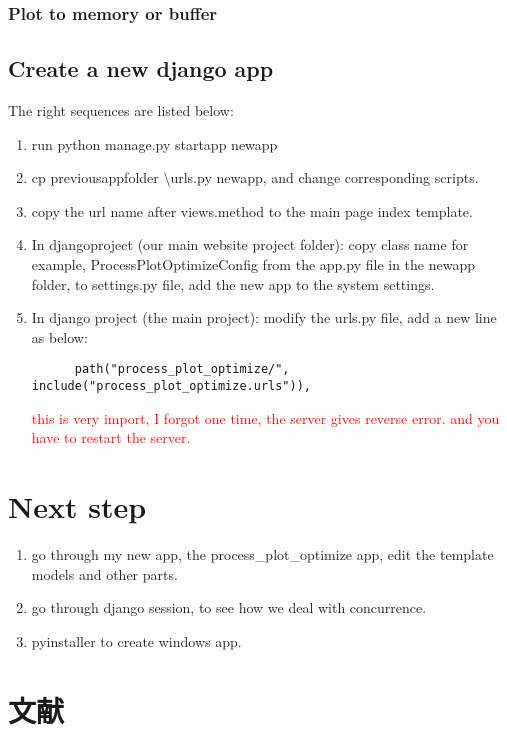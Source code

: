 \documentclass[UTF8,fancyhdr,a4paper]{ctexart}
\newcommand{\pflred}[1]{\textcolor{red}{#1}}
\begin{document}
\subsubsection{Plot to memory or buffer}

\subsection{Create a new django app}
The right sequences are listed below:
\begin{enumerate}
      \item run python manage.py startapp newapp
      \item cp previous\textunderscore app\textunderscore folder \textbackslash urls.py newapp, and change corresponding scripts.
      \item copy the url name after views.method to the main page index template.
      \item In django\textunderscore project (our main website project folder): copy class name for example, ProcessPlotOptimizeConfig from the app.py file in the newapp folder, to settings.py file, add the new app to the system settings.
      \item In django \textunderscore project (the main project): modify the urls.py file, add a new line as below: \begin{verbatim}
      path("process_plot_optimize/", include("process_plot_optimize.urls")),
      \end{verbatim} \pflred{this is very import, I forgot one time, the server gives reverse error. and you have to restart the server.}
\end{enumerate}




\section{Next step}
\begin{enumerate}
      \item go through my new app, the process\_plot\_optimize app, edit the template models and other parts.
      \item go through django session, to see how we deal with concurrence.
      \item pyinstaller to create windows app.
\end{enumerate}















\newpage
\section{文献}
\cite{10cm}


\end{document}
